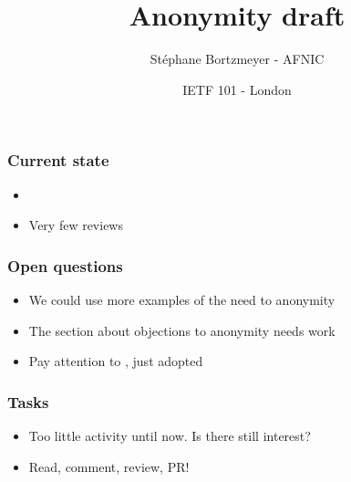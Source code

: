 \documentclass[ignorenonframetext]{beamer}
\title{Anonymity draft}
\author{Stéphane Bortzmeyer - AFNIC}
\date{IETF 101 - London}
\begin{document}
\begin{frame}
\maketitle  
\end{frame}

\begin{frame}
  \frametitle{Current state}
  \begin{itemize}
  \item<2->
  \item<3->Very few reviews  
  \end{itemize}
\end{frame}

\begin{frame}
  \frametitle{Open questions}
  \begin{itemize}
  \item<2->We could use more examples of the need to anonymity
  \item<3->The section about objections to anonymity needs work
  \item<4->Pay attention to , just adopted
  \end{itemize}
\end{frame}

\begin{frame}
  \frametitle{Tasks}
  \begin{itemize}
  \item<2->Too little activity until now. Is there still interest?
  \item<3->Read, comment, review, PR!
  \end{itemize}
\end{frame}
\end{document}
